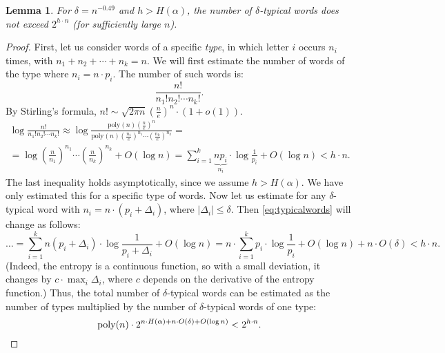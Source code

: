 \documentclass[12pt,sans]{article}
\newcommand{\poly}{\mathrm{poly}}
\theoremstyle{definition}
\theoremstyle{plain}
\newtheorem{lemma}{Lemma}[section]
\theoremstyle{remark}
\begin{document}
\begin{lemma}\label{lm:typicalcount}
    For \(\delta = n^{-0.49}\) and \(h > H(\alpha)\), the number of \(\delta\)-typical words does not exceed \(2^{h \cdot n}\) (for sufficiently large \(n\)).
\end{lemma}
\begin{proof}
    First, let us consider words of a specific \emph{type}, in which letter \(i\) occurs \(n_i\) times, with \(n_1 + n_2 + \dotsb + n_k = n\). We will first estimate the number of words of the type where \(n_i = n \cdot p_i\). The number of such words is:
    \[
    \frac{n!}{n_1! n_2! \dotsm n_k!}.
    \]
    By Stirling's formula, \(n! \sim \sqrt{2\pi n}\left(\frac{n}{e}\right)^n \cdot (1 + o(1))\).
    \begin{multline}\label{eq:typicalwords}
        \log \frac{n!}{n_1! n_2! \dotsm n_k!} \approx
        \log \frac{\poly(n) \left(\frac{n}{e}\right)^n}
        {\poly(n)\left(\frac{n_1}{e}\right)^{n_1}\dotsm
            \left(\frac{n_k}{e}\right)^{n_k}} = \\
        = \log \left(\frac{n}{n_1}\right)^{n_1}\dotsm
        \left(\frac{n}{n_k}\right)^{n_k} + O(\log n)
        = \sum_{i=1}^k \underbrace{np_i}_{n_i}\cdot
        \log{\textstyle\frac{1}{p_i}} + O(\log n) < h \cdot n.
    \end{multline}
    The last inequality holds asymptotically, since we assume \(h > H(\alpha)\).
    We have only estimated this for a specific type of words. Now let us estimate for any \(\delta\)-typical word with \(n_i = n \cdot (p_i + \Delta_i)\), where \(|\Delta_i| \le \delta\). Then \eqref{eq:typicalwords} will change as follows:
    \[
    \dots =
    \sum_{i=1}^k n(p_i + \Delta_i) \cdot
    \log{\textstyle\frac{1}{p_i + \Delta_i}} + O(\log n) =
    n \cdot \sum_{i=1}^k p_i \cdot
    \log{\textstyle\frac{1}{p_i}} + O(\log n) + n \cdot O(\delta) < h \cdot n.
    \]
    (Indeed, the entropy is a continuous function, so with a small deviation, it changes by \(c \cdot \max_i \Delta_i\), where \(c\) depends on the derivative of the entropy function.)
    Thus, the total number of \(\delta\)-typical words can be estimated as the number of types multiplied by the number of \(\delta\)-typical words of one type:
    \[
    \poly(n) \cdot 2^{n \cdot H(\alpha) + n \cdot O(\delta) + O(\log n)} < 2^{h \cdot n}. \qedhere
    \]
\end{proof}
\end{document}
